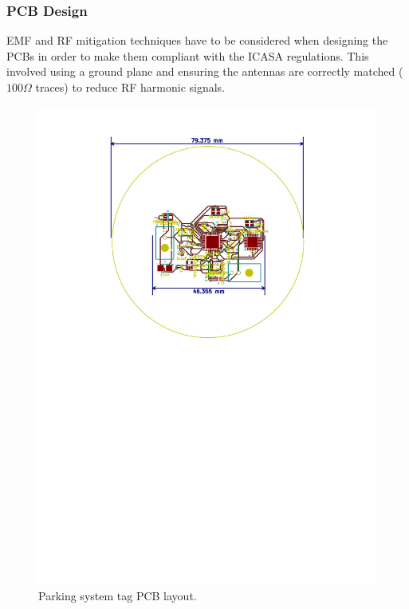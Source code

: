 \newpage
\subsubsection{PCB Design}

EMF and RF mitigation techniques have to be considered when designing the PCBs in order to make them compliant with the ICASA regulations. This involved using a ground plane and ensuring the antennas are correctly matched ($100\Omega$ traces) to reduce RF harmonic signals.

\begin{figure}[H]
\begin{center}
\includegraphics[scale=0.7,trim={4cm 15cm 4cm 1cm},clip]{data/pcb-layout.pdf}
\caption{Parking system tag PCB layout.}
\end{center}
\end{figure}

